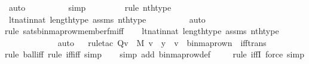 \begin{isabellebody}
\ auto{\isacharbrackleft}{\kern0pt}{}{\isacharbrackright}{\kern0pt}\isanewline
\ \ \ \ \ \ \ \ \isamarkupfalse%
\ simp\isanewline
\ \ \ \ \ \ \ \ \isamarkupfalse%
{\isacharparenleft}{\kern0pt}rule\ nth{\isacharunderscore}{\kern0pt}type{\isacharparenright}{\kern0pt}\isanewline
\ \ \isamarkupfalse%
\ lt{\isacharunderscore}{\kern0pt}nat{\isacharunderscore}{\kern0pt}in{\isacharunderscore}{\kern0pt}nat\ length{\isacharunderscore}{\kern0pt}type\ assms\ nth{\isacharunderscore}{\kern0pt}type\isanewline
\ \ \ \ \ \ \ \ \isamarkupfalse%
\ auto{\isacharbrackleft}{\kern0pt}{}{\isacharbrackright}{\kern0pt}\isanewline
\ \ \ \isamarkupfalse%
{\isacharparenleft}{\kern0pt}rule\ sats{\isacharunderscore}{\kern0pt}binmap{\isacharunderscore}{\kern0pt}row{\isacharprime}{\kern0pt}{\isacharunderscore}{\kern0pt}member{\isacharunderscore}{\kern0pt}fm{\isacharunderscore}{\kern0pt}iff{\isacharparenright}{\kern0pt}\isanewline
\ \ \isamarkupfalse%
\ lt{\isacharunderscore}{\kern0pt}nat{\isacharunderscore}{\kern0pt}in{\isacharunderscore}{\kern0pt}nat\ length{\isacharunderscore}{\kern0pt}type\ assms\ nth{\isacharunderscore}{\kern0pt}type\isanewline
\ \ \ \ \ \ \ \ \ \ \ \isamarkupfalse%
\ auto{\isacharbrackleft}{\kern0pt}{}{\isacharbrackright}{\kern0pt}\isanewline
\ \ \isamarkupfalse%
{\isacharparenleft}{\kern0pt}rule{\isacharunderscore}{\kern0pt}tac\ Q{\isacharequal}{\kern0pt}{\isachardoublequoteopen}{\isasymforall}v\ {\isasymin}\ M{\isachardot}{\kern0pt}\ v\ {\isasymin}\ y\ {\isasymlongleftrightarrow}\ v\ {\isasymin}\ binmap{\isacharunderscore}{\kern0pt}row{\isacharprime}{\kern0pt}{\isacharparenleft}{\kern0pt}n{\isacharparenright}{\kern0pt}{\isachardoublequoteclose}\ \ iff{\isacharunderscore}{\kern0pt}trans{\isacharparenright}{\kern0pt}\isanewline
\ \ \ \isamarkupfalse%
{\isacharparenleft}{\kern0pt}rule\ ball{\isacharunderscore}{\kern0pt}iff{\isacharcomma}{\kern0pt}\ rule\ iff{\isacharunderscore}{\kern0pt}iff{\isacharcomma}{\kern0pt}\ simp{\isacharparenright}{\kern0pt}\isanewline
\ \ \ \isamarkupfalse%
{\isacharparenleft}{\kern0pt}simp\ add{\isacharcolon}{\kern0pt}\ binmap{\isacharunderscore}{\kern0pt}row{\isacharprime}{\kern0pt}{\isacharunderscore}{\kern0pt}def{\isacharparenright}{\kern0pt}\isanewline
\ \ \ \isamarkupfalse%
\ {\isacharparenleft}{\kern0pt}rule\ iffI{\isacharcomma}{\kern0pt}\ force{\isacharcomma}{\kern0pt}\ simp{\isacharparenright}{\kern0pt}\isanewline

\end{isabellebody}
